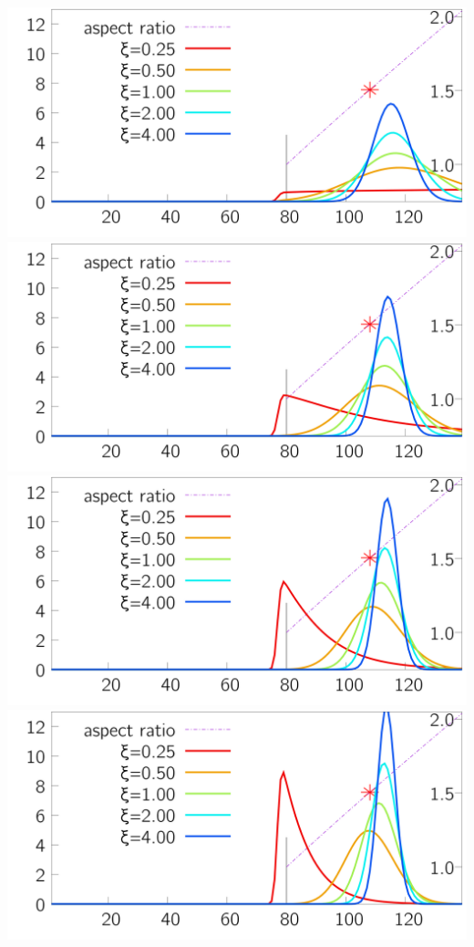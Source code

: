 \begin{minipage}{0.25\textwidth} 
 \includegraphics[width=\textwidth ]{../plots_size-distribution_png/plot_size-distribution_eagg4-ki1__xi.png}
\includegraphics[width=\textwidth ]{../plots_size-distribution_png/plot_size-distribution_eagg4-ki2__xi.png}
\includegraphics[width=\textwidth ]{../plots_size-distribution_png/plot_size-distribution_eagg4-ki3__xi.png}
\includegraphics[width=\textwidth ]{../plots_size-distribution_png/plot_size-distribution_eagg4-ki4__xi.png}
\end{minipage}%

